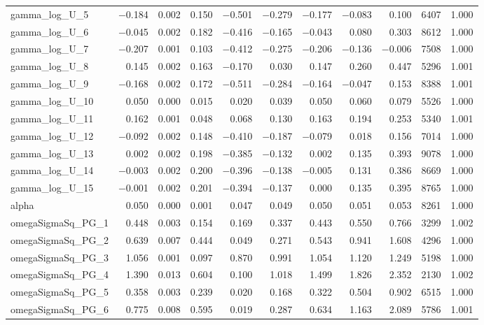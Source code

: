 \documentclass[12pt]{article}
\begin{document}
\begin{longtable}{lrrrrrrrrrr}
gamma\_log\_U\_5  & $-$0.184 & 0.002 & 0.150 & $-$0.501 & $-$0.279 & $-$0.177 & $-$0.083 &  0.100 &  6407 & 1.000 \\
gamma\_log\_U\_6  & $-$0.045 & 0.002 & 0.182 & $-$0.416 & $-$0.165 & $-$0.043 &  0.080 &  0.303 &  8612 & 1.000 \\
gamma\_log\_U\_7  & $-$0.207 & 0.001 & 0.103 & $-$0.412 & $-$0.275 & $-$0.206 & $-$0.136 & $-$0.006 &  7508 & 1.000 \\
gamma\_log\_U\_8  &  0.145 & 0.002 & 0.163 & $-$0.170 &  0.030 &  0.147 &  0.260 &  0.447 &  5296 & 1.001 \\
gamma\_log\_U\_9  & $-$0.168 & 0.002 & 0.172 & $-$0.511 & $-$0.284 & $-$0.164 & $-$0.047 &  0.153 &  8388 & 1.001 \\
gamma\_log\_U\_10 &  0.050 & 0.000 & 0.015 &  0.020 &  0.039 &  0.050 &  0.060 &  0.079 &  5526 & 1.000 \\
gamma\_log\_U\_11 &  0.162 & 0.001 & 0.048 &  0.068 &  0.130 &  0.163 &  0.194 &  0.253 &  5340 & 1.001 \\
gamma\_log\_U\_12 & $-$0.092 & 0.002 & 0.148 & $-$0.410 & $-$0.187 & $-$0.079 &  0.018 &  0.156 &  7014 & 1.000 \\
gamma\_log\_U\_13 &  0.002 & 0.002 & 0.198 & $-$0.385 & $-$0.132 &  0.002 &  0.135 &  0.393 &  9078 & 1.000 \\
gamma\_log\_U\_14 & $-$0.003 & 0.002 & 0.200 & $-$0.396 & $-$0.138 & $-$0.005 &  0.131 &  0.386 &  8669 & 1.000 \\
gamma\_log\_U\_15 & $-$0.001 & 0.002 & 0.201 & $-$0.394 & $-$0.137 &  0.000 &  0.135 &  0.395 &  8765 & 1.000 \\
\addlinespace
alpha & 0.050 & 0.000 & 0.001 & 0.047 & 0.049 & 0.050 & 0.051 & 0.053 & 8261 & 1.000 \\
\addlinespace
omegaSigmaSq\_PG\_1  & 0.448 & 0.003 & 0.154 & 0.169 & 0.337 & 0.443 & 0.550 & 0.766 &  3299 & 1.002 \\
omegaSigmaSq\_PG\_2  & 0.639 & 0.007 & 0.444 & 0.049 & 0.271 & 0.543 & 0.941 & 1.608 &  4296 & 1.000 \\
omegaSigmaSq\_PG\_3  & 1.056 & 0.001 & 0.097 & 0.870 & 0.991 & 1.054 & 1.120 & 1.249 &  5198 & 1.000 \\
omegaSigmaSq\_PG\_4  & 1.390 & 0.013 & 0.604 & 0.100 & 1.018 & 1.499 & 1.826 & 2.352 &  2130 & 1.002 \\
omegaSigmaSq\_PG\_5  & 0.358 & 0.003 & 0.239 & 0.020 & 0.168 & 0.322 & 0.504 & 0.902 &  6515 & 1.000 \\
omegaSigmaSq\_PG\_6  & 0.775 & 0.008 & 0.595 & 0.019 & 0.287 & 0.634 & 1.163 & 2.089 &  5786 & 1.001 \\

\end{longtable}
\end{document}
